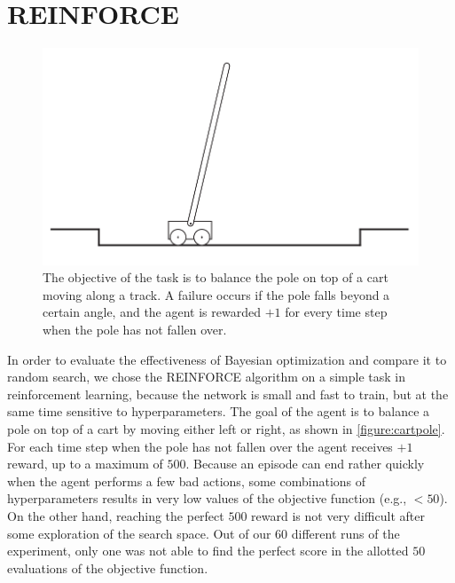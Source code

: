 \section{REINFORCE}
\label{section:experiments-empirical-bayes}

\begin{figure}[t]
	\begin{center}
		\includegraphics[width=1.0\textwidth]{images/cartpole.png}
		\caption{The objective of the task is to balance the pole on top of a cart moving along
			a track. A failure occurs if the pole falls beyond a certain angle, and the agent
			is rewarded $+1$ for every time step when the pole has not fallen over.}
		\label{figure:cartpole}
	\end{center}
\end{figure}

In order to evaluate the effectiveness of Bayesian optimization and compare it
to random search, we chose the REINFORCE algorithm on a simple task in
reinforcement learning, because the network is small and fast to train, but at
the same time sensitive to hyperparameters. The goal of the agent is to balance
a pole on top of a cart by moving either left or right, as shown in
\autoref{figure:cartpole}. For each time step when the pole has not fallen over
the agent receives $+1$ reward, up to a maximum of $500$. Because an episode
can end rather quickly when the agent performs a few bad actions, some
combinations of hyperparameters results in very low values of the objective
function (e.g., $< 50$). On the other hand, reaching the perfect $500$ reward
is not very difficult after some exploration of the search space. Out of our
$60$ different runs of the experiment, only one was not able to find the
perfect score in the allotted $50$ evaluations of the objective function.

